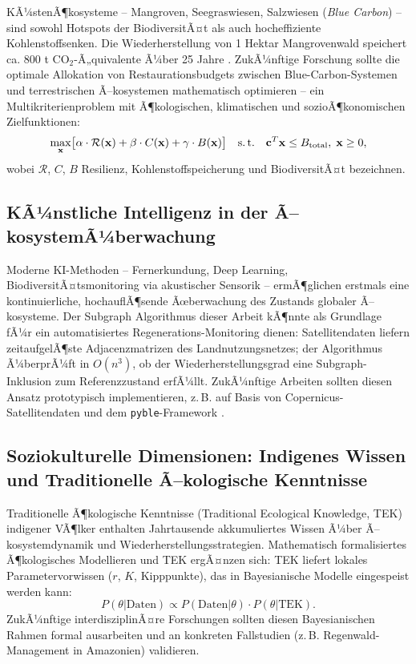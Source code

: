 ﻿\documentclass[a4paper,12pt]{article}
\theoremstyle{definition}
\begin{document}
KÃ¼stenÃ¶kosysteme -- Mangroven, Seegraswiesen, Salzwiesen (\emph{Blue Carbon}) -- sind sowohl Hotspots der BiodiversitÃ¤t als auch hocheffiziente Kohlenstoffsenken. Die Wiederherstellung von 1 Hektar Mangrovenwald speichert ca. 800 t $\mathrm{CO}_2$-Ã„quivalente Ã¼ber 25 Jahre \cite{donato2011mangroves}. ZukÃ¼nftige Forschung sollte die optimale Allokation von Restaurationsbudgets zwischen Blue-Carbon-Systemen und terrestrischen Ã–kosystemen mathematisch optimieren -- ein Multikriterienproblem mit Ã¶kologischen, klimatischen und sozioÃ¶konomischen Zielfunktionen:
\[
\max_{\mathbf{x}} \bigl[\alpha \cdot \mathcal{R}(\mathbf{x}) + \beta \cdot C(\mathbf{x}) + \gamma \cdot B(\mathbf{x})\bigr]
\quad \text{s.\,t.} \quad \mathbf{c}^T \mathbf{x} \leq B_{\text{total}},\; \mathbf{x} \geq 0,
\]
wobei $\mathcal{R}$, $C$, $B$ Resilienz, Kohlenstoff\-speicherung und BiodiversitÃ¤t bezeichnen.

\subsection{KÃ¼nstliche Intelligenz in der Ã–kosystemÃ¼berwachung}

Moderne KI-Methoden -- Fernerkundung, Deep Learning, BiodiversitÃ¤tsmonitoring via akustischer Sensorik -- ermÃ¶glichen erstmals eine kontinuierliche, hochauflÃ¶sende Ãœberwachung des Zustands globaler Ã–kosysteme. Der Subgraph Algorithmus dieser Arbeit kÃ¶nnte als Grundlage fÃ¼r ein automatisiertes Regenerations-Monitoring dienen: Satellitendaten liefern zeitaufgelÃ¶ste Adjacenzmatrizen des Landnutzungsnetzes; der Algorithmus Ã¼berprÃ¼ft in $O(n^3)$, ob der Wiederherstellungsgrad eine Subgraph-Inklusion zum Referenzzustand erfÃ¼llt. ZukÃ¼nftige Arbeiten sollten diesen Ansatz prototypisch implementieren, z.\,B. auf Basis von Copernicus-Satellitendaten und dem \texttt{pyble}-Framework \cite{epp2026pyble}.

\subsection{Soziokulturelle Dimensionen: Indigenes Wissen und Traditionelle Ã–kologische Kenntnisse}

Traditionelle Ã¶kologische Kenntnisse (Traditional Ecological Knowledge, TEK) indigener VÃ¶lker enthalten Jahrtausende akkumuliertes Wissen Ã¼ber Ã–kosystemdynamik und Wiederherstellungsstrategien. Mathematisch formalisiertes Ã¶kologisches Modellieren und TEK ergÃ¤nzen sich: TEK liefert lokales Parametervorwissen ($r$, $K$, Kipppunkte), das in Bayesianische Modelle eingespeist werden kann:
\[
P(\theta | \text{Daten}) \propto P(\text{Daten} | \theta) \cdot P(\theta | \text{TEK}).
\]
ZukÃ¼nftige interdisziplinÃ¤re Forschungen sollten diesen Bayesianischen Rahmen formal ausarbeiten und an konkreten Fallstudien (z.\,B. Regenwald-Management in Amazonien) validieren.
\end{document}
